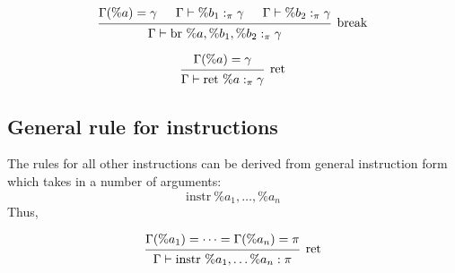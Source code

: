 \documentclass{article}
\begin{document}
\[
\begin{prooftree}
    \hypo{\Gamma(\%a) = \gamma}
    \hypo{\Gamma \vdash \%b_1 :_\pi \gamma} 
    \hypo{\Gamma \vdash \%b_2 :_\pi \gamma} 
    \infer3[break]{\Gamma \vdash \text{br }\%a, \%b_1, \%b_2 :_\pi \gamma}
\end{prooftree}
\]

\[
\begin{prooftree}
    \hypo{\Gamma(\%a) = \gamma}
    \infer1[ret]{\Gamma \vdash \text{ret }\%a :_\pi \gamma}
\end{prooftree}
\]

\subsection{General rule for instructions}

The rules for all other instructions
can be derived from general instruction form which takes in
a number of arguments:
$$\text{instr}\ \%a_1, \dots, \%a_n$$
Thus,

\[
\begin{prooftree}
    \hypo{\Gamma(\%a_1) = \dots = \Gamma(\%a_n) = \pi}
    \infer1[ret]{\Gamma \vdash \text{instr}\ \%a_1, \dots \%a_n : \pi}
\end{prooftree}
\]
\end{document}
